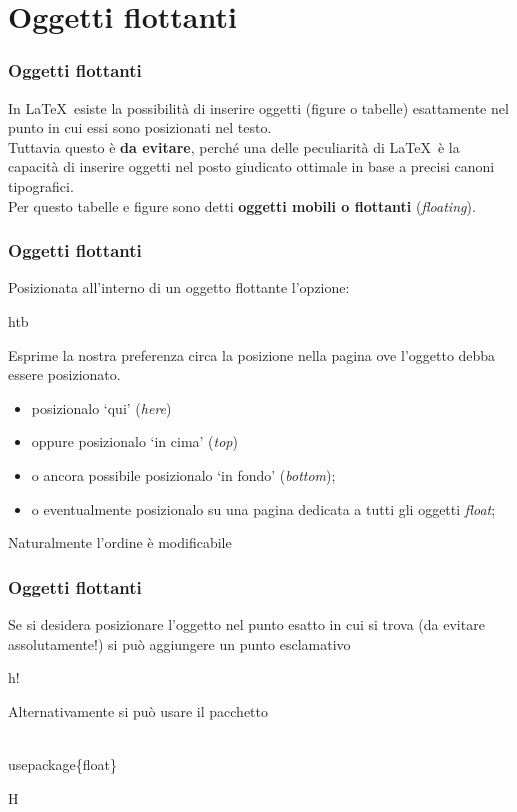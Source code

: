 \documentclass[svgnames,%
	ucs,%
	pdftex]{guitbeamer}
\begin{document}
\section{Oggetti flottanti}
\begin{frame}
  \frametitle{Oggetti flottanti}
	In \LaTeX\ esiste la possibilit\`a di inserire oggetti (figure o tabelle) esattamente nel punto in cui essi sono posizionati nel testo.\\
  \smallskip
	Tuttavia questo \`e \textbf{da evitare}, perch\'e una delle peculiarit\`a di \LaTeX\ \`e la capacit\`a di inserire oggetti nel posto giudicato ottimale in base a precisi canoni tipografici.\\
  \bigskip
	Per questo tabelle e figure sono detti \textbf{oggetti mobili o flottanti} (\emph{floating}).
\end{frame}
\begin{frame}
  \frametitle{Oggetti flottanti}
	Posizionata all'interno di un oggetto flottante l'opzione:
	\begin{LaTeXcode}
		\tls htb\trs 
	\end{LaTeXcode}	
	Esprime la nostra preferenza circa la posizione nella pagina ove l'oggetto debba essere posizionato. 
  \medskip
	\begin{itemize}
		\item {} posizionalo `qui' (\emph{here})
		\item {} oppure posizionalo `in cima' (\emph{top})
		\item {} o ancora possibile posizionalo `in fondo' (\emph{bottom}); 
		\item {} o eventualmente posizionalo su una pagina dedicata a tutti gli oggetti \textit{float}; 
	\end{itemize}
	Naturalmente l'ordine \`e modificabile
\end{frame}
\begin{frame}
  \frametitle{Oggetti flottanti}
	Se si desidera posizionare l'oggetto nel punto esatto in cui si trova (da evitare assolutamente!) si pu\`o aggiungere un punto esclamativo
	\begin{LaTeXcode}
		\tls h!\trs 
	\end{LaTeXcode}	
  \medskip
	Alternativamente si pu\`o usare il pacchetto \LCmd[]{float}
	\begin{LaTeXcode}
		\\usepackage\{\alert{float}\}
	\end{LaTeXcode}	
	\begin{LaTeXcode}
		\tls H\trs
	\end{LaTeXcode}	
\end{frame}
\end{document}
